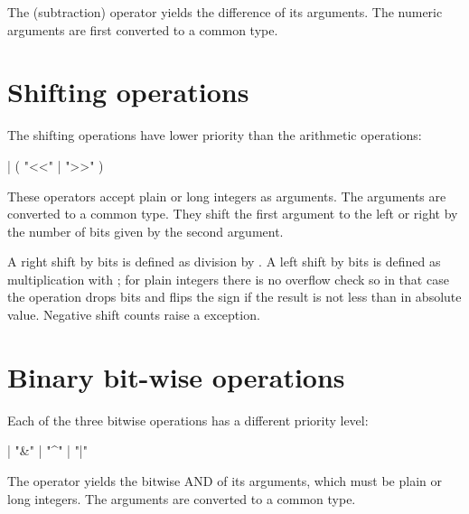 The \code{-} (subtraction) operator yields the difference of its
arguments.  The numeric arguments are first converted to a common
type.


\section{Shifting operations\label{shifting}}

The shifting operations have lower priority than the arithmetic
operations:

\begin{productionlist}
             {
              |  ( "<{}<" | ">{}>" ) }
\end{productionlist}

These operators accept plain or long integers as arguments.  The
arguments are converted to a common type.  They shift the first
argument to the left or right by the number of bits given by the
second argument.

A right shift by  bits is defined as division by
.  A left shift by  bits is defined as
multiplication with ; for plain integers there is
no overflow check so in that case the operation drops bits and flips
the sign if the result is not less than  in absolute
value.  Negative shift counts raise a 
exception.


\section{Binary bit-wise operations\label{bitwise}}

Each of the three bitwise operations has a different priority level:

\begin{productionlist}
             { |  "\&" }
             { |  "\textasciicircum" }
             { |  "|" }
\end{productionlist}

The \code{\&} operator yields the bitwise AND of its arguments, which
must be plain or long integers.  The arguments are converted to a
common type.

